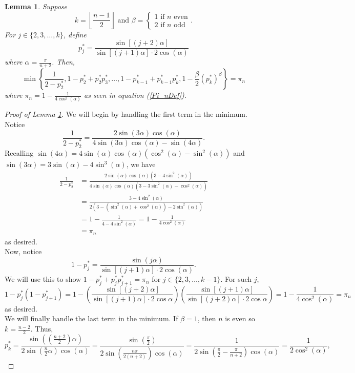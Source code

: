 \documentclass[11pt]{article}
\newtheorem{lemma}[theorem]{Lemma}
\theoremstyle{definition}
\begin{document}
\begin{lemma}\label{U(*)=Pi_n}
    Suppose
    $$k = \left\lfloor \frac{n-1}{2} \right\rfloor \text{ and } \beta = \begin{cases} 1 \text{ if } n \text{ even} \\ 2 \text{ if } n \text{ odd} \end{cases}.$$
    For $j\in \{2,3,\dots,k \}$, define
    $$p_j^* = \frac{\sin[(j+2)\alpha]}{\sin[(j+1)\alpha]\cdot 2 \cos(\alpha)}$$
    where $\alpha= \frac{\pi}{n+2}$. Then,
    $$\min \left\{ \frac{1}{2-p_2^*},1-p_2^*+p_2^*p_3^*, \dots, 1-p_{k-1}^*+p_{k-1}^*p_{k}^*, 1-\frac{\beta}{2}(p_k^*)^\beta \right\} = \pi_n$$
    where $\pi_n = 1-\frac{1}{4\cos^2(\alpha)}$ as seen in equation (\ref{Pi_nDef}).
\end{lemma}
\begin{proof}[Proof of Lemma \ref{U(*)=Pi_n}]
    We will begin by handling the first term in the minimum. Notice
    $$\frac{1}{2-p_2^*} = \frac{2\sin(3\alpha)\cos(\alpha)}{4\sin(3\alpha)\cos(\alpha) - \sin(4\alpha)}.$$
    Recalling $\sin(4\alpha) = 4\sin(\alpha)\cos(\alpha)\left( \cos^2(\alpha) - \sin^2(\alpha) \right)$ and $\sin(3\alpha) = 3\sin(\alpha) - 4\sin^3(\alpha)$, we have
    \begin{align*}
        \frac{1}{2-p_2^*} &= \frac{2\sin(\alpha)\cos(\alpha) \left(3-4\sin^2(\alpha) \right)}{4\sin(\alpha)\cos(\alpha) \left( 3-3\sin^2(\alpha)-\cos^2(\alpha) \right)} \\
        &= \frac{3-4\sin^2(\alpha)}{2\left( 3 - \left(\sin^2(\alpha)+ \cos^2(\alpha) \right) -2\sin^2(\alpha) \right)} \\
        &= 1 - \frac{1}{4-4\sin^2(\alpha)} = 1-\frac{1}{4\cos^2(\alpha)} \\
        &= \pi_n
    \end{align*}
    as desired.
    \\ Now, notice
    $$1-p_j^* = \frac{\sin(j\alpha)}{\sin\left[ (j+1)\alpha \right] \cdot 2\cos(\alpha)}.$$
    We will use this to show $1-p_j^*+p_j^*p_{j+1}^* = \pi_n$ for $j \in \{ 2,3,\dots,k-1 \}$. For such $j$,
    $$1-p_j^*(1-p_{j+1}^*) = 1-\left( \frac{\sin\left[ (j+2)\alpha \right]}{\sin\left[ (j+1)\alpha \right] \cdot 2\cos\alpha} \right) \left( \frac{\sin[(j+1)\alpha]}{\sin[(j+2)\alpha] \cdot 2\cos \alpha} \right) = 1-\frac{1}{4\cos^2(\alpha)} = \pi_n$$
    as desired.
    \\ We will finally handle the last term in the minimum. If $\beta = 1$, then $n$ is even so $k = \frac{n-2}{2}$. Thus,
    $$p_k^* = \frac{\sin\left( \left(\frac{n+2}{2} \right) \alpha \right)}{2\sin \left( \frac{n}{2} \alpha \right) \cos(\alpha)} = \frac{\sin\left( \frac{\pi}{2} \right)}{2\sin \left( \frac{n\pi}{2(n+2)} \right)\cos(\alpha)} = \frac{1}{2\sin\left( \frac{\pi}{2} - \frac{\pi}{n+2} \right) \cos(\alpha)} = \frac{1}{2\cos^2(\alpha)},$$

\end{proof}
\end{document}
